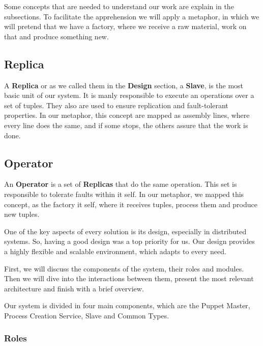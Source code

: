 \documentclass[times, 10pt,twocolumn]{article}
\begin{document}
 Some concepts that are needed to understand our work are explain in the subsections. To facilitate the apprehension we will apply a metaphor, in which we will pretend that we have a factory, where we receive a raw material, work on that and produce something new. 
 
 \subsection{Replica}
 A \textbf{Replica} or as we called them in the \textbf{Design} section, a \textbf{Slave}, is the most basic unit of our system. It is manly responsible to execute an operations over a set of tuples. They also are used to ensure replication and fault-tolerant properties. In our metaphor, this concept are mapped as assembly lines, where every line does the same, and if some stops, the others assure that the work is done.
 
 \subsection{Operator}
 An \textbf{Operator} is a set of \textbf{Replicas} that do the same operation. This set is responsible to tolerate faults within it self. In our metaphor, we mapped this concept, as the factory it self, where it receives tuples, process them and produce new tuples.




One of the key aspects of every solution is its design, especially in distributed systems. So, having a good design was a top priority for us. Our design provides a highly flexible and scalable environment, which adapts to every need.

First, we will discuss the components of the system, their roles and modules. Then we will dive into the interactions between them, present the most relevant architecture and finish with a brief overview.


Our system is divided in four main components, which are the Puppet Master, Process Creation Service, Slave and Common Types.

\subsubsection{Roles}
\end{document}
